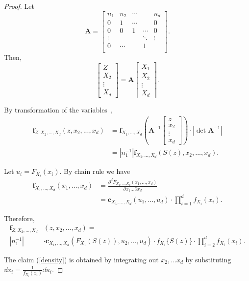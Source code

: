 \documentclass[11pt,a4paper,english]{article}
\begin{document}
\begin{proof}
  Let
    \[\mathbf A=\displaystyle \begin{bmatrix}
      n_1    & n_2  & \cdots &    & n_d     \\
      0      & 1    & \cdots  &    & 0       \\
      0      & 0    & 1 &  \cdots & 0       \\
      \vdots &      & & \ddots & \vdots \\
      0      & \cdots &       & 1  \\
    \end{bmatrix}.\]
    Then,
    \begin{equation*}
      \begin{bmatrix}
        Z \\ X_2 \\ \vdots \\ X_d
      \end{bmatrix}
      = \bm{A}
      \begin{bmatrix}
         X_1 \\ X_2 \\ \vdots \\ X_d
      \end{bmatrix}.
    \end{equation*}

   By transformation of the variables~\citep[Section 4.3]{hardle2019applied},
   \begin{align*}
      \bm{f}_{Z,X_2,...,X_d}(z, x_2, ...,x_d) &= \bm{f}_{X_1,...,X_d}\left( \bm{A}^{-1}
      \begin{bmatrix}
         z \\ x_2 \\ \vdots \\ x_d
      \end{bmatrix}
      \right)  \cdot |\det \bm{A}^{-1}| \\
      &= \left| n_1^{-1} \right| \bm{f}_{X_1,...,X_d}\left(S(z), x_2,...,x_d\right).
      \end{align*} \medskip

   Let $u_i = F_{X_i}(x_i)$. By chain rule we have
   \begin{align*}
       \bm{f}_{X_1,...,X_d}(x_1,...,x_d) &= \frac{\partial^d F_{X_1,...,X_d}(x_1, ..., x_d)}{\partial x_1 ... \partial x_d}\\
                                         &= \bm{c}_{X_1,...,X_d}(u_1, ..., u_d) \cdot \prod_{i=1}^d f_{X_i}(x_i).
   \end{align*}

    Therefore,
   \begin{align*}
      \bm{f}_{Z,X_2,...,X_d}&(z, x_2, ...,x_d) = \\
       \left| n_1^{-1} \right| &\cdot
      \bm{c}_{X_1,...,X_d}\left(F_{X_1}( S(z)), u_2, ...,  u_d\right)  \cdot
      f_{X_1} \{ S(z) \} \cdot
      \prod_{i=2}^d f_{X_i}(x_i).
      \end{align*}

   The claim (\ref{density}) is obtained by integrating out $x_2, ... x_d$ by substituting $\dd x_i = \frac{1}{f_{X_i}(x_i)} \dd u_i$.
   \end{proof}
\end{document}
